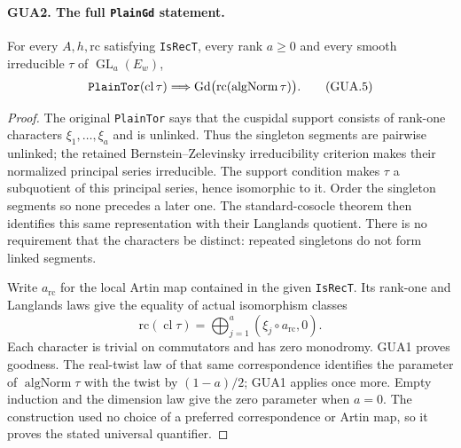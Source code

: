 \documentclass[11pt,a4paper]{article}
\numberwithin{equation}{section}
\theoremstyle{remark}\newtheorem{remark}[theorem]{Remark}
\begin{document}
\paragraph{GUA2. The full \texttt{Plain\allowbreak Gd} statement.}
\label{claim:GUA2}
For every $A,h,\mathrm{rc}$ satisfying \texttt{Is\allowbreak Rec\allowbreak T}, every
rank $a\geq0$ and every smooth irreducible $\tau$ of
$\operatorname{GL}_a(E_w)$,
\[
 \texttt{Plain\allowbreak Tor}(\operatorname{cl}\tau)
            \Longrightarrow
       \operatorname{Gd}\bigl(\mathrm{rc}(\operatorname{algNorm}\tau)\bigr).
                                                        \tag{GUA.5}
\]
\begin{proof}
The original \texttt{Plain\allowbreak Tor} says that the cuspidal support
consists of rank-one characters $\xi_1,\ldots,\xi_a$ and is
unlinked.  Thus the singleton segments are pairwise unlinked;
the retained Bernstein--Zelevinsky irreducibility criterion
makes their normalized principal series irreducible.  The
support condition makes $\tau$ a subquotient of this principal
series, hence isomorphic to it.  Order the singleton segments
so none precedes a later one.  The standard-cosocle theorem
then identifies this same representation with their Langlands
quotient.  There is no requirement that the characters be
distinct: repeated singletons do not form linked segments.

Write $a_{\mathrm{rc}}$ for the local Artin map contained in
the given \texttt{Is\allowbreak Rec\allowbreak T}.  Its rank-one and Langlands laws
give the equality of actual isomorphism classes
\[
 \mathrm{rc}(\operatorname{cl}\tau)
       =\bigoplus_{j=1}^a (\xi_j\circ a_{\mathrm{rc}},0).
\]
Each character is trivial on commutators and has zero
monodromy.  GUA1 proves goodness.  The real-twist law of
that same correspondence identifies the parameter of
$\operatorname{algNorm}\tau$ with the twist by $(1-a)/2$;
GUA1 applies once more.  Empty induction and the dimension
law give the zero parameter when $a=0$.  The construction
used no choice of a preferred correspondence or Artin map,
so it proves the stated universal quantifier.
\end{proof}

\end{document}
